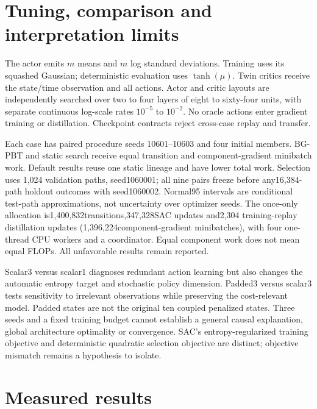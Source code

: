 \section{Tuning, comparison and interpretation limits}
The actor emits $m$ means and $m$ log standard deviations. Training uses its
squashed Gaussian; deterministic evaluation uses $\tanh(\mu)$. Twin critics
receive the state/time observation and all actions. Actor and critic layouts
are independently searched over two to four layers of eight to sixty-four
units, with separate continuous log-scale rates $10^{-5}$ to $10^{-2}$.
No oracle actions enter gradient training or distillation. Checkpoint contracts
reject cross-case replay and transfer.

Each case has paired procedure seeds 10601--10603 and four initial members.
BG-PBT and static search receive equal transition and component-gradient
minibatch work. Default results reuse one static lineage and have lower total
work. Selection uses 1,024 validation paths, seed1060001; all nine pairs freeze
before any16,384-path holdout outcomes with seed1060002. Normal95 intervals
are conditional test-path approximations, not uncertainty over optimizer seeds.
The once-only allocation is1,400,832transitions,347,328SAC updates and2,304
training-replay distillation updates (1,396,224component-gradient minibatches),
with four one-thread CPU workers and a coordinator. Equal component work does
not mean equal FLOPs. All unfavorable results remain reported.

Scalar3 versus scalar1 diagnoses redundant action learning but also changes
the automatic entropy target and stochastic policy dimension. Padded3 versus
scalar3 tests sensitivity to irrelevant observations while preserving the
cost-relevant model. Padded states are not the original ten coupled penalized
states. Three seeds and a fixed training budget cannot establish a general
causal explanation, global architecture optimality or convergence. SAC's
entropy-regularized training objective and deterministic quadratic selection
objective are distinct; objective mismatch remains a hypothesis to isolate.

\section{Measured results}


